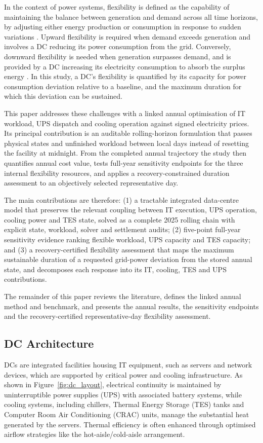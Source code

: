 \documentclass[lettersize,journal]{IEEEtran}
\begin{document}
In the context of power systems, flexibility is defined as the capability of maintaining the balance between generation and demand across all time horizons, by adjusting either energy production or consumption in response to sudden variations \cite{Centrica2020LEM, EEAACER2023Flex, neso2025future, Nosair2015TSTE}. Upward flexibility is required when demand exceeds generation and involves a DC reducing its power consumption from the grid. Conversely, downward flexibility is needed when generation surpasses demand, and is provided by a DC increasing its electricity consumption to absorb the surplus energy \cite{Centrica2020LEM, NG2017SNAPS}. In this study, a DC's flexibility is quantified by its capacity for power consumption deviation relative to a baseline, and the maximum duration for which this deviation can be sustained.

This paper addresses these challenges with a linked annual optimisation of IT
workload, UPS dispatch and cooling operation against signed electricity prices.
Its principal contribution is an auditable rolling-horizon formulation that
passes physical states and unfinished workload between local days instead of
resetting the facility at midnight. From the completed annual trajectory the
study then quantifies annual cost value, tests full-year sensitivity endpoints
for the three internal flexibility resources, and applies a
recovery-constrained duration assessment to an objectively selected
representative day.

The main contributions are therefore: (1) a tractable integrated data-centre
model that preserves the relevant coupling between IT execution, UPS operation,
cooling power and TES state, solved as a complete 2025 rolling chain with
explicit state, workload, solver and settlement audits; (2) five-point full-year
sensitivity evidence ranking flexible workload, UPS capacity and TES capacity;
and (3) a recovery-certified flexibility assessment that maps the maximum
sustainable duration of a requested grid-power deviation from the stored annual
state, and decomposes each response into its IT, cooling, TES and UPS
contributions.

The remainder of this paper reviews the literature, defines the linked annual
method and benchmark, and presents the annual results, the sensitivity endpoints
and the recovery-certified representative-day flexibility assessment.

\subsection{DC Architecture}
DCs are integrated facilities housing IT equipment, such as servers and network devices, which are supported by critical power and cooling infrastructure. As shown in Figure~\ref{fig:dc_layout}, electrical continuity is maintained by uninterruptible power supplies (UPS) with associated battery systems, while cooling systems, including chillers, Thermal Energy Storage (TES) tanks and  Computer Room Air Conditioning (CRAC) units, manage the substantial heat generated by the servers. Thermal efficiency is often enhanced through optimised airflow strategies like the hot-aisle/cold-aisle arrangement.
\end{document}
